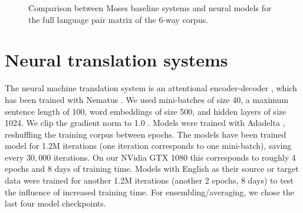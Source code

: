 \documentclass[11pt]{article}
\begin{document}
\begin{figure*}[p]
\centering
{}
\caption{Comparison between Moses baseline systems and neural models for the full language pair matrix of the 6-way corpus.}\label{pbsmtnmt1}
\end{figure*}

\section{Neural translation systems}

The neural machine translation system is an attentional encoder-decoder \cite{DBLP:journals/corr/BahdanauCB14}, which has been trained with Nematus  \cite{DBLP:conf/wmt/SennrichHB16}.
We used mini-batches of size 40, a maximum sentence length of 100, word embeddings of size 500, and hidden layers of size 1024.
We clip the gradient norm to 1.0 \cite{DBLP:conf/icml/PascanuMB13}.
Models were trained with Adadelta \cite{DBLP:journals/corr/abs-1212-5701}, reshuffling the training corpus between epochs.
The models have been trained model for 1.2M iterations (one iteration corresponds to one mini-batch), saving every $30,000$ iterations. On our NVidia GTX 1080 this corresponds to roughly 4 epochs and 8 days of training time. Models with English as their source or target data were trained for another 1.2M iterations (another 2 epochs, 8 days) to test the influence of increased training time. For ensembling/averaging, we chose the last four model checkpoints.
\end{document}
